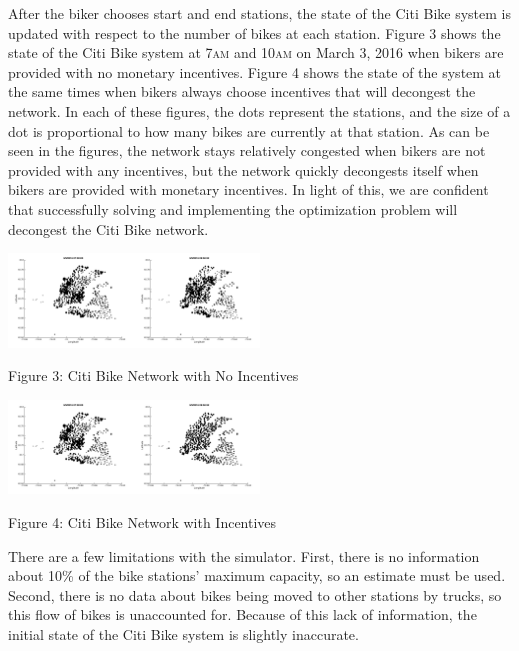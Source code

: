 \documentclass[times, 10pt,twocolumn]{article}
\begin{document}
After the biker chooses start and end stations, the state of the Citi Bike system is updated with respect to the number of bikes at each station. Figure 3 shows the state of the Citi Bike system at 7\textsc{am} and 10\textsc{am} on March 3, 2016 when bikers are provided with no monetary incentives. Figure 4 shows the state of the system at the same times when bikers always choose incentives that will decongest the network. In each of these figures, the dots represent the stations, and the size of a dot is proportional to how many bikes are currently at that station. As can be seen in the figures, the network stays relatively congested when bikers are not provided with any incentives, but the network quickly decongests itself when bikers are provided with monetary incentives. In light of this, we are confident that successfully solving and implementing the optimization problem will decongest the Citi Bike network.

\centerline{\includegraphics[width=0.25\textwidth]{m2/no_incentives_before.png}\includegraphics[width=0.25\textwidth]{m2/no_incentives_after.png}}
\centerline{Figure 3: Citi Bike Network with No Incentives}
\centerline{\includegraphics[width=0.25\textwidth]{m2/incentives_before.png}\includegraphics[width=0.25\textwidth]{m2/incentives_after.png}}
\centerline{Figure 4: Citi Bike Network with Incentives}
\hfill \break
\indent There are a few limitations with the simulator. First, there is no information about 10\% of the bike stations' maximum capacity, so an estimate must be used. Second, there is no data about bikes being moved to other stations by trucks, so this flow of bikes is unaccounted for. Because of this lack of information, the initial state of the Citi Bike system is slightly inaccurate.
\end{document}
